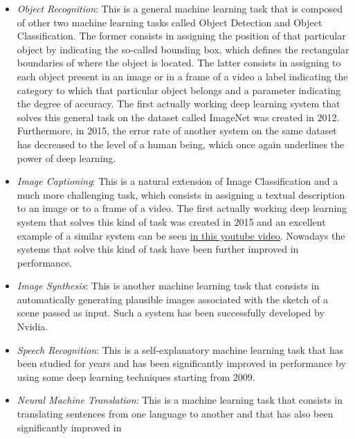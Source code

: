 \begin{itemize}
    \item \emph{Object Recognition}: This is a general machine
          learning task that is composed of other two machine learning
          tasks called Object Detection and Object Classification. The
          former consists in assigning the position of that particular
          object by indicating the so-called bounding box, which defines the
          rectangular boundaries of where the object is located.
          The latter consists in assigning to each object present in an
          image or in a frame of a video a label indicating the category
          to which that particular object belongs and a parameter
          indicating the degree of accuracy. The first actually
          working deep learning system that solves this general task on
          the dataset called ImageNet was created in 2012.
          Furthermore, in 2015, the error rate of another system on the
          same dataset has decreased to the level of a human being,
          which once again underlines the power of deep learning.
    \item \emph{Image Captioning}: This is a natural extension of
          Image Classification and a much more challenging task, which
          consists in assigning a textual description to an image or to
          a frame of a video. The first actually working deep learning
          system that solves this kind of task was created in 2015 and
          an excellent example of a similar system can be seen
          \href{https://www.youtube.com/watch?v=8BFzu9m52sc}{\underline{in this youtube video}}.
          Nowadays the systems that solve this kind of task have been
          further improved in performance.
    \item \emph{Image Synthesis}: This is another machine learning task
          that consists in automatically generating plausible images
          associated with the sketch of a scene passed as input. Such a
          system has been successfully developed by Nvidia.
    \item \emph{Speech Recognition}: This is a self-explanatory machine
          learning task that has been studied for years and has been
          significantly improved in performance by using some deep
          learning techniques starting from 2009.
    \item \emph{Neural Machine Translation}: This is a machine learning
          task that consists in translating sentences from one language
          to another and that has also been significantly improved in

\end{itemize}
